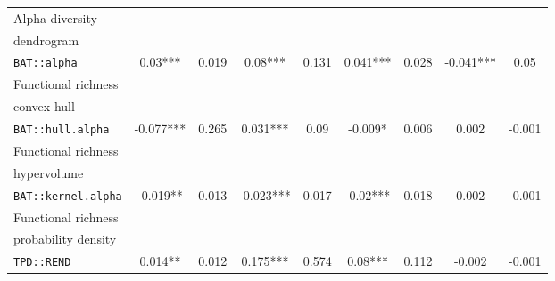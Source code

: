 \documentclass[12pt,letterpaper]{article}
\begin{document}
\begin{landscape}
\begin{table}
\begin{tabular}[t]{l|c|c|c|c|c|c|c|c}
\hline
Alpha diversity\\dendrogram\\ \texttt{BAT::alpha} & 0.03*** & 0.019 & 0.08*** & 0.131 & 0.041*** & 0.028 & -0.041*** & 0.05\\
\hline
Functional richness\\convex hull\\ \texttt{BAT::hull.alpha} & -0.077*** & 0.265 & 0.031*** & 0.09 & -0.009* & 0.006 & 0.002 & -0.001\\
\hline
Functional richness\\hypervolume\\ \texttt{BAT::kernel.alpha} & -0.019** & 0.013 & -0.023*** & 0.017 & -0.02*** & 0.018 & 0.002 & -0.001\\
\hline
Functional richness\\probability density\\ \texttt{TPD::REND} & 0.014** & 0.012 & 0.175*** & 0.574 & 0.08*** & 0.112 & -0.002 & -0.001\\
\hline
\end{tabular}
\end{table}
\end{landscape}





\end{document}
